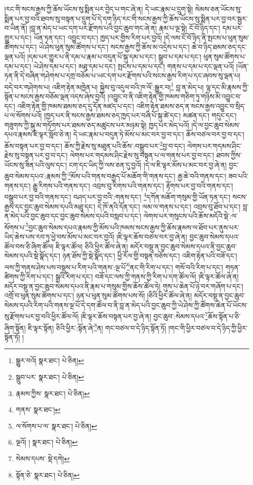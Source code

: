 །རང་གི་སངས་རྒྱས་ཀྱི་ཆོས་ཡོངས་སུ་སྨིན་པར་བྱེད་པ་གང་ཞེ་ན། དེ་ཡང་རྣམ་པ་དྲུག་སྟེ། སེམས་ཅན་ཡོངས་སུ་སྨིན་པར་བྱ་བའི་ཐབས་སུ་བསྟན་པ་དྲུག་པོ་དེ་དག་ཉིད་རང་གི་སངས་རྒྱས་ཀྱི་ཆོས་ཡོངས་སུ་སྨིན་པར་བྱ་བར་སྦྱར་བ་ཡིན་ནོ། །བླ་ན་མེད་པ་ཡང་དག་པར་རྫོགས་པའི་བྱང་ཆུབ་གང་ཞེ་ན། རྣམ་པ་ལྔ་སྟེ། ངོ་བོ་ཉིད་དང་། དམ་པར་གྱུར་པ་དང་། ཡོན་ཏན་དང་། འབྱུང་བ་དང་། ཁྱད་པར་གྱིས་རིག་པར་བྱའོ། །དེ་ལས་ངོ་བོ་ཉིད་ནི་སྤངས་པ་ཕུན་སུམ་ཚོགས་པ་དང་། ཡེ་ཤེས་ཕུན་སུམ་ཚོགས་པ་དང་། སངས་རྒྱས་ཀྱི་ཆོས་མ་འདྲེས་པ་དང་། ཆེ་བ་ཉིད་ཐམས་ཅད་དང་ལྡན་པའོ། །དམ་པར་གྱུར་པ་ནི་དམ་པ་རྣམ་པ་བདུན་པོ་སྐུ་དམ་པ་དང་། སྒྲུབ་པ་དམ་པ་དང་། ཕུན་སུམ་ཚོགས་པ་དམ་པ་དང་། ཡེ་ཤེས་དམ་པ་དང་། མཐུ་དམ་པ་དང་། སྤངས་པ་དམ་པ་དང་། གནས་པ་དམ་པ་དང་ལྡན་པའོ། །ཡོན་ཏན་ནི་དེ་བཞིན་གཤེགས་པ་དགྲ་བཅོམ་པ་ཡང་དག་པར་རྫོགས་པའི་སངས་རྒྱས་རིག་པ་དང་ཞབས་སུ་ལྡན་པ། བདེ་བར་གཤེགས་པ། འཇིག་རྟེན་མཁྱེན་པ། སྐྱེས་བུ་འདུལ་བའི་ཁ་ལོ་:སྒྱུར་བ།\footnote{སྒྱུར་བའོ།  སྣར་ཐང་།  པེ་ཅིན། } བླ་ན་མེད་པ། ལྷ་དང་མི་རྣམས་ཀྱི་སྟོན་པ་སངས་རྒྱས་བཅོམ་ལྡན་འདས་ཞེས་བྱའོ། །འབྱུང་བ་ནི་འཇིག་རྟེན་གྱི་ཁམས་གཅིག་ཏུ་གཉིས་མི་འབྱུང་བ་དང་། འཇིག་རྟེན་གྱི་ཁམས་ཐམས་ཅད་དུ་དོན་མཛད་པ་དང་། འཇིག་རྟེན་ཐམས་ཅད་ན་སངས་རྒྱས་འབྱུང་བ་སྲིད་པ་ལ་སོགས་པའོ། །ཁྱད་པར་ནི་སངས་རྒྱས་ཐམས་ཅད་ཁྱད་པར་བཞི་པོ་སྐུ་ཚེ་དང་། མཚན་དང་། གདུང་དང་། གཟུགས་ཀྱི་སྐུ་མ་གཏོགས་པར་ཐམས་ཅད་མཚུངས་པར་མཉམ་སྟེ། ཁྱད་པར་མེད་པའོ། །དེ་ལ་བྱང་ཆུབ་སེམས་དཔའ་རྣམས་ཇི་ལྟར་སློབ་ཅེ་ན། དེ་ཡང་རྣམ་པ་བདུན་ཏེ་མོས་པ་མང་བར་བྱ་བ་དང་། ཆོས་བཙལ་བར་བྱ་བ་དང་། ཆོས་བསྟན་པར་བྱ་བ་དང་། ཆོས་ཀྱི་རྗེས་སུ་མཐུན་པའི་ཆོས་:བསྒྲུབ་པར་\footnote{སྒྲུབ་པར་  སྣར་ཐང་།  པེ་ཅིན། }བྱ་བ་དང་། ལེགས་པར་གདམས་ཤིང་རྗེས་སུ་བསྟན་པར་བྱ་བ་དང་། ལེགས་པར་གདམས་ཤིང་རྗེས་སུ་བསྟན་པ་ལ་གནས་པར་བྱ་བ་དང་། ཐབས་ཀྱིས་ཡོངས་སུ་ཟིན་པའི་ལུས་དང་། ངག་དང་ཡིད་ཀྱི་ལས་ཅན་དུ་བྱའོ། །དེ་ལ་ཇི་ལྟར་མོས་པ་མང་བར་བྱ་ཞེ་ན། བྱང་ཆུབ་སེམས་དཔའ་:རྣམས་ཀྱི་\footnote{རྣམས་ཀྱིས་  སྣར་ཐང་།  པེ་ཅིན། }མོས་པའི་གནས་བརྒྱད་པོ་མཆོག་གི་གནས་དང་། རྒྱ་ཆེ་བའི་གནས་དང་། ཟབ་པའི་གནས་དང་། རྒྱུ་རིགས་པའི་གནས་དང་། འབྲས་བུ་རིགས་པའི་གནས་དང་། རྟོགས་པར་བྱ་བའི་གནས་དང་། བསྒྲུབ་པར་བྱ་བའི་གནས་དང་། བཤད་པར་བྱ་བའི་:གནས་དང་། \footnote{གནས་  སྣར་ཐང་། }དཀོན་མཆོག་གསུམ་གྱི་ཡོན་ཏན་དང་། སངས་རྒྱས་དང་བྱང་ཆུབ་སེམས་དཔའི་མཐུ་དང་། དེ་ཁོ་ནའི་དོན་དང་། ལམ་ལ་གནས་པ་དང་། འབྲས་བུ་ཐོབ་པ་དང་། བླ་ན་མེད་པའི་བྱང་ཆུབ་དང་བྱང་ཆུབ་སེམས་དཔའི་བསླབ་པ་དང་། ལེགས་པར་གསུངས་པའི་ཆོས་མདོའི་སྡེ་:ལ་སོགས་པ་\footnote{ལ་སོགས་པ་ལ་  སྣར་ཐང་།  པེ་ཅིན། }བྱང་ཆུབ་སེམས་དཔའ་རྣམས་ཀྱི་མོས་པའི་ཁམས་སངས་རྒྱས་ཀྱི་ཆོས་རྣམས་ལ་ཐོབ་པར་ནུས་པར་ཡིད་ཆེས་པས་རབ་ཏུ་ཕྱེ་བས་མོས་པ་མང་བར་བྱའོ། །ཇི་ལྟར་ཆོས་བཙལ་བར་བྱ་ཞེ་ན། བྱང་ཆུབ་སེམས་དཔའ་ཚོལ་བས་ཅི་ཞིག་ཚོལ། ཇི་ལྟར་ཚོལ། ཅིའི་ཕྱིར་ཚོལ་ཞེ་ན། མདོར་བསྡུ་ན་བྱང་ཆུབ་སེམས་དཔའ་ནི་བྱང་ཆུབ་སེམས་དཔའི་སྡེ་སྣོད་དང་། ཉན་ཐོས་ཀྱི་སྡེ་སྣོད་དང་། ཕྱི་རོལ་གྱི་བསྟན་བཅོས་དང་། འཇིག་རྟེན་པའི་བཟོ་དང་། ལས་ཀྱི་གནས་ཤེས་པས་བསྡུས་པ་རིག་པའི་གནས་:ལྔ་པོ་\footnote{ལྔའོ། །  སྣར་ཐང་།  པེ་ཅིན། }ནང་གི་རིག་པ་དང་། གསོ་བའི་རིག་པ་དང་། གཏན་ཚིགས་ཀྱི་རིག་པ་དང་། སྒྲའི་རིག་པ་དང་། བཟོ་དང་ལས་ཀྱི་གནས་ཀྱི་རིག་པ་དག་ཚོལ་ལོ། །ཇི་ལྟར་ཚོལ་ཞེ་ན། མདོར་བསྡུ་ན་བྱང་ཆུབ་སེམས་དཔའ་ནི་རྣམ་པ་གསུམ་གྱིས་ཆོས་ཚོལ་ཏེ། གུས་པ་ཆེན་པོ་ཉེ་བར་གཞོག་པ་དང་། འགྲོ་བ་ཕུན་སུམ་ཚོགས་པ་དང་། ཉན་པ་ཕུན་སུམ་ཚོགས་པས་སོ། །ཅིའི་ཕྱིར་ཚོལ་ཞེ་ན། མདོར་བསྡུ་ན་བྱང་ཆུབ་སེམས་དཔའི་རིག་པའི་གནས་ལྔ་པོ་དེ་དག་ཚོལ་བ་ནི་བླ་ན་མེད་པའི་བྱང་ཆུབ་ཀྱི་ཡེ་ཤེས་ཀྱི་ཚོགས་ཆེན་པོ་ཡོངས་སུ་རྫོགས་པར་བྱ་བའི་ཕྱིར་ཚོལ་ལོ། །ཇི་ལྟར་ཆོས་བསྟན་པར་བྱ་ཞེ་ན། བྱང་ཆུབ་:སེམས་དཔའ་\footnote{སེམས་དཔས་  སྡེ་དགེ། }ཆོས་སྟོན་པ་ཅི་ཞིག་སྟོན། ཇི་ལྟར་སྟོན། ཅིའི་ཕྱིར་:སྟོན་ཞེ་\footnote{སྟོན་ཅེ་  སྣར་ཐང་།  པེ་ཅིན། }ན། གང་བཙལ་བ་དེ་ཉིད་སྟོན་ཏོ། །གང་གི་ཕྱིར་བཙལ་བ་དེ་ཉིད་ཀྱི་ཕྱིར་སྟོན་ཏོ། །
